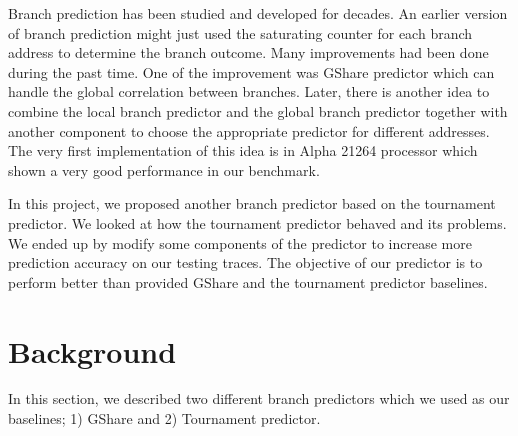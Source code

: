 \documentclass[conference]{IEEEtran}
\begin{document}
Branch prediction has been studied and developed for decades. An earlier version of branch prediction
might just used the saturating counter for each branch address to determine the branch outcome.
Many improvements had been done during the past time. One of the improvement was GShare predictor which can handle
the global correlation between branches. Later, there is another idea to combine the local branch predictor and the global
branch predictor together with another component to choose the appropriate predictor for different
addresses. The very first implementation of this idea is in Alpha 21264 processor \cite{Alpha21264} which shown a very good performance
in our benchmark.

In this project, we proposed another branch predictor based on the tournament predictor. We looked at how the tournament predictor
behaved and its problems. We ended up by modify some components of the predictor to increase more prediction
accuracy on our testing traces. The objective of our predictor is to perform better than provided GShare and
the tournament predictor baselines.

\section{Background}

In this section, we described two different branch predictors which we used as our baselines;
1) GShare and 2) Tournament predictor.
\end{document}
